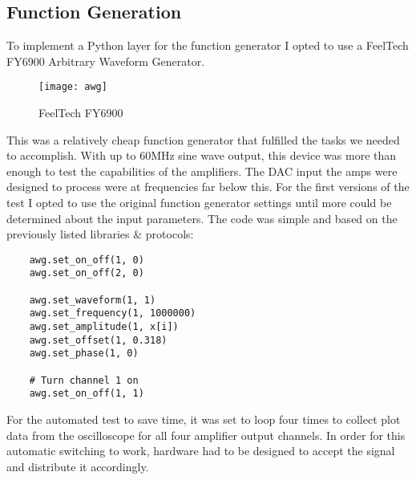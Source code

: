 \subsection{Function Generation}
To implement a Python layer for the function generator I opted to use a FeelTech FY6900 Arbitrary Waveform Generator.
\begin{figure}[!htb]
	\centering
	\texttt{[image: awg]}
	\caption{FeelTech FY6900}
\end{figure}
This was a relatively cheap function generator that fulfilled the tasks we needed to accomplish. With up to 60MHz sine wave output, this device was more than enough to test the capabilities of the amplifiers. The DAC input the amps were designed to process were at frequencies far below this. For the first versions of the test I opted to use the original function generator settings until more could be determined about the input parameters. The code was simple and based on the previously listed libraries \& protocols:
\begin{lstlisting}
	awg.set_on_off(1, 0)
	awg.set_on_off(2, 0)

	awg.set_waveform(1, 1)
	awg.set_frequency(1, 1000000)
	awg.set_amplitude(1, x[i])
	awg.set_offset(1, 0.318)
	awg.set_phase(1, 0)

	# Turn channel 1 on
	awg.set_on_off(1, 1)
\end{lstlisting}
For the automated test to save time, it was set to loop four times to collect plot data from the oscilloscope for all four amplifier output channels. In order for this automatic switching to work, hardware had to be designed to accept the signal and distribute it accordingly.
